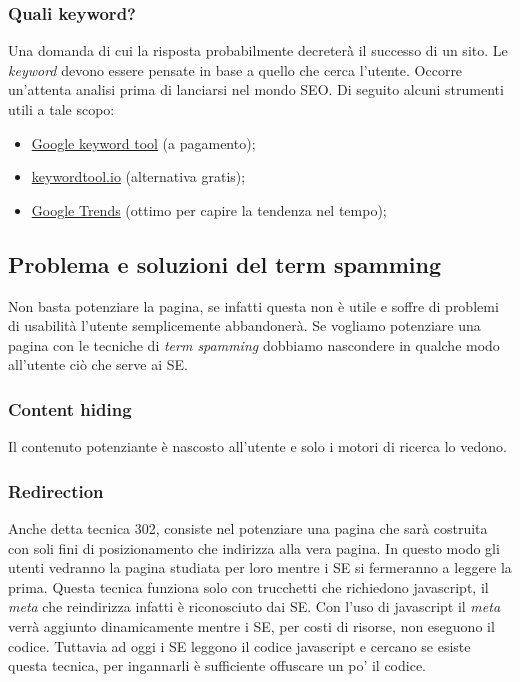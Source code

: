 			\subsubsection{Quali keyword?}
				Una domanda di cui la risposta probabilmente decreterà il successo di un sito. Le \emph{keyword} devono essere pensate in base a quello che cerca l'utente. Occorre un'attenta analisi prima di lanciarsi nel mondo SEO. Di seguito alcuni strumenti utili a tale scopo:
				\begin{itemize}
					\item \href{https://adwords.google.com/KeywordPlanner}{Google keyword tool} (a pagamento);
					\item \href{http://keywordtool.io/}{keywordtool.io} (alternativa gratis);
					\item \href{https://www.google.it/trends/}{Google Trends} (ottimo per capire la tendenza nel tempo);
				\end{itemize}
			
		\subsection{Problema e soluzioni del term spamming}
			Non basta potenziare la pagina, se infatti questa non è utile e soffre di problemi di usabilità l'utente semplicemente abbandonerà. Se vogliamo potenziare una pagina con le tecniche di \emph{term spamming} dobbiamo nascondere in qualche modo all'utente ciò che serve ai SE.
		
			\subsubsection{Content hiding}
				Il contenuto potenziante è nascosto all'utente e solo i motori di ricerca lo vedono.
			
			\subsubsection{Redirection}
				Anche detta tecnica 302, consiste nel potenziare una pagina che sarà costruita con soli fini di posizionamento che indirizza alla vera pagina. In questo modo gli utenti vedranno la pagina studiata per loro mentre i SE si fermeranno a leggere la prima. Questa tecnica funziona solo con trucchetti che richiedono javascript, il \emph{meta} che reindirizza infatti è riconosciuto dai SE. Con l'uso di javascript il \emph{meta} verrà aggiunto dinamicamente mentre i SE, per costi di risorse, non eseguono il codice. Tuttavia ad oggi i SE leggono il codice javascript e cercano se esiste questa tecnica, per ingannarli è sufficiente offuscare un po' il codice.
			
